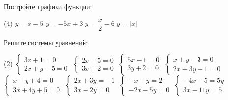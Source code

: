 \begin{class}[number=4]
\begin{listofex}
		
		\item Постройте графики функции:
		\begin{tasks}(4)
			\task \( y=x-5 \)
			\task \( y=-5x+3 \)
			\task \( y=\dfrac{ x }{ 2 }-6 \)
			\task \( y=|x| \)
		\end{tasks}
		\item Решите системы уравнений:
		\begin{tasks}(2)
			\task \( \begin{cases} 3x+1=0 \\ 2x+y-5=0 \end{cases} \)
			\task \( \begin{cases} 2x-5=0 \\ 3x+2=0 \end{cases} \)
			\task \( \begin{cases} 5x-1=0 \\ 3y+2=0 \end{cases} \)
			\task \( \begin{cases} x+y-3=0 \\ 2x-3y-1=0 \end{cases} \)
			\task \( \begin{cases} x-y+4=0 \\ 3x+4y+5=0 \end{cases} \)
			\task \( \begin{cases} 2x+3y=-1 \\ 3x-2y=0 \end{cases} \)
			\task \( \begin{cases} -x+y=2 \\ -2x-5y=0 \end{cases} \)
			\task \( \begin{cases} -4x-5=5y \\ 3x-11y=5 \end{cases} \)
		\end{tasks}
		
		
	\end{listofex}
\end{class}

